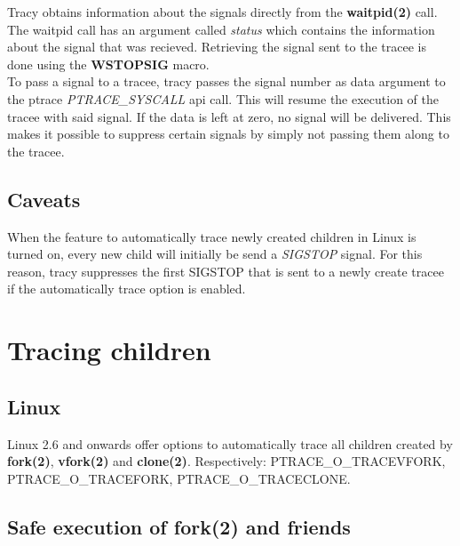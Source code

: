 \documentclass[a4paper, 10pt]{report}
\begin{document}
Tracy obtains information about the signals directly from the
\textbf{waitpid(2)} call. The waitpid call has an argument called
\textit{status} which contains the information about the signal that was
recieved. Retrieving the signal sent to the tracee is done using the
\textbf{WSTOPSIG} macro. \\

To pass a signal to a tracee, tracy passes the signal number as data
argument to the ptrace \textit{PTRACE\_SYSCALL} api call. This will
resume the execution of the tracee with said signal. If the data is
left at zero, no signal will be delivered. This makes it possible to
suppress certain signals by simply not passing them along to the tracee.


\subsection{Caveats}

When the feature to automatically trace newly created children in Linux
is turned on, every new child will initially be send a \textit{SIGSTOP}
signal. For this reason, tracy suppresses the first SIGSTOP that is sent
to a newly create tracee if the automatically trace option is enabled.

\section{Tracing children}


\subsection{Linux}

Linux 2.6 and onwards offer options to automatically trace all children
created by \textbf{fork(2)}, \textbf{vfork(2)} and \textbf{clone(2)}.
Respectively: PTRACE\_O\_TRACEVFORK, PTRACE\_O\_TRACEFORK,
PTRACE\_O\_TRACECLONE.


\subsection{Safe execution of fork(2) and friends}
\label{safe-fork}
\end{document}
